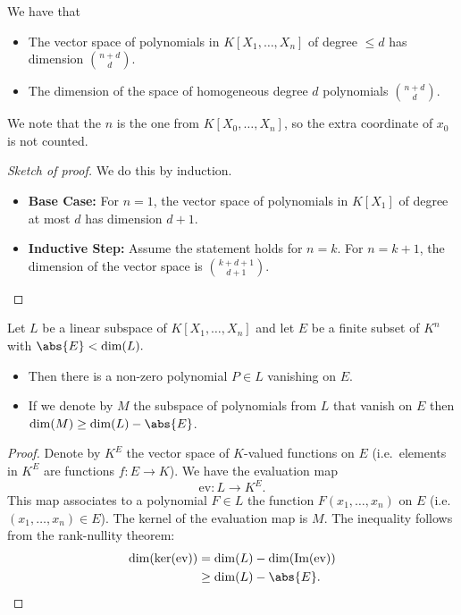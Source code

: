 \documentclass[12pt, a4paper]{article}
\begin{document}
\begin{mdprop}
    We have that 
    \begin{itemize}
        \item The vector space of polynomials in \(K[X_1,\ldots,X_n]\) of degree \(\leq d\) has dimension \(\binom{n+d}{d}\).
        \item The dimension of the space of homogeneous degree \(d\) polynomials \(\binom{n+d}{d}\).
    \end{itemize}
\end{mdprop}

\begin{mdnote}
    We note that the \(n\) is the one from \(K[X_0,\ldots,X_n]\), so the extra coordinate of \(x_0\) is not counted.
\end{mdnote}

\begin{proof}[Sketch of proof]
    We do this by induction.
    \begin{itemize}
        \item \textbf{Base Case:} For \(n = 1\), the vector space of polynomials in \(K[X_1]\) of degree at most \(d\) has dimension \(d+1\).
        \item \textbf{Inductive Step:} Assume the statement holds for \(n = k\). For \(n = k+1\), the dimension of the vector space is \(\binom{k + d + 1}{d + 1}\).
    \end{itemize}
\end{proof}

\begin{mdlemma}
    Let \(L\) be a linear subspace of \(K[X_1,\ldots,X_n]\) and let \(E\) be a finite subset of \(K^n\) with \(\abs{E}<\dim(L).\)
    \begin{itemize}
        \item Then there is a non-zero polynomial \(P \in L\) vanishing on \(E\).
        \item If we denote by \(M\) the subspace of polynomials from \(L\) that vanish on \(E\) then \(\dim(M) \geq \dim(L)-\abs{E}\).
    \end{itemize}
\end{mdlemma}

\begin{proof}
    Denote by \(K^E\) the vector space of \(K\)-valued functions on \(E\) (i.e.\ elements in \(K^E\) are functions \(f:E \to K\)). We have the evaluation map 
    \[\text{ev}:L \to K^E.\]
    This map associates to a polynomial \(F \in L\) the function \(F(x_1,\ldots,x_n)\) on \(E\) (i.e.\ \({(x_1,\ldots,x_n) \in E}\)).
    The kernel of the evaluation map is \(M\). The inequality follows from the rank-nullity theorem:
    \[\begin{aligned}
        \dim(\ker(\text{ev}))&=\dim(L)-\dim(\text{Im}(\text{ev})) \\
        &\geq \dim(L)-\abs{E}.
    \end{aligned}\]
\end{proof}
\end{document}
